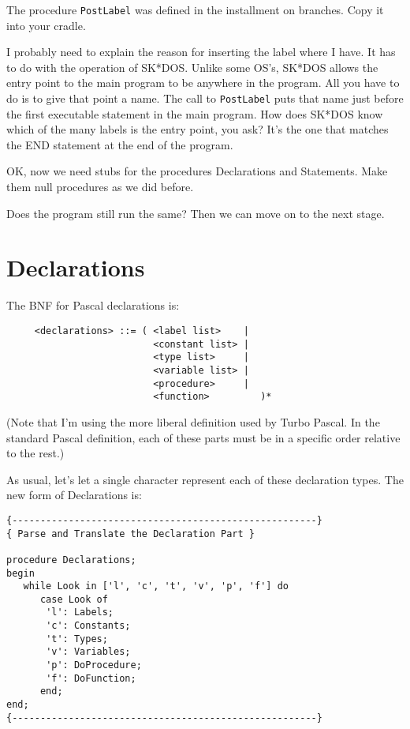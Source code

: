 The  procedure {\tt PostLabel}  was  defined  in  the  installment  on branches. Copy it into your cradle.

I probably need to  explain  the  reason  for inserting the label where I have. It has to do with the operation of SK*DOS. Unlike some OS's, SK*DOS allows the entry point to the main  program to be  anywhere in the program. All you have to do is to give  that point a name. The call  to  {\tt PostLabel} puts that name just before the first executable statement  in  the  main  program. How does SK*DOS know which of the many labels is the entry point, you ask?  It's the one that matches the END statement  at  the  end  of the program.

OK, now  we  need  stubs  for  the  procedures Declarations  and Statements. Make them null procedures as we did before.

Does the program  still run the same?  Then we can move on to the next stage.

\section{Declarations}

The BNF for Pascal declarations is:

\begin{verbatim}
     <declarations> ::= ( <label list>    |
                          <constant list> |
                          <type list>     |
                          <variable list> |
                          <procedure>     |
                          <function>         )*
\end{verbatim}

(Note  that  I'm  using the more liberal definition used by Turbo Pascal. In the standard Pascal definition, each  of  these parts must be in a specific order relative to the rest.)

As  usual, let's  let a single character represent each of these declaration types. The new form of Declarations is:

\begin{verbatim}
{------------------------------------------------------}
{ Parse and Translate the Declaration Part }

procedure Declarations;
begin
   while Look in ['l', 'c', 't', 'v', 'p', 'f'] do
      case Look of
       'l': Labels;
       'c': Constants;
       't': Types;
       'v': Variables;
       'p': DoProcedure;
       'f': DoFunction;
      end;
end;
{------------------------------------------------------}
\end{verbatim}

